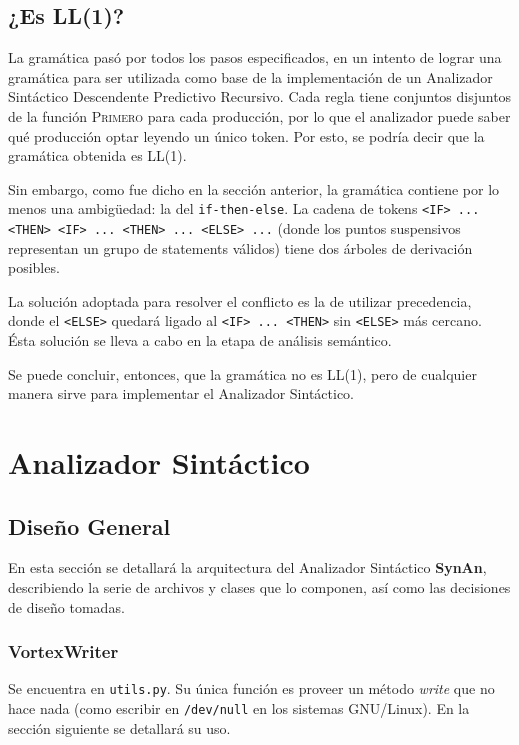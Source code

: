 \documentclass[a4paper,oneside]{report}
\begin{document}
\section{¿Es LL(1)?}
La gramática pasó por todos los pasos especificados, en un intento de lograr una gramática para ser utilizada como base de la implementación de un Analizador Sintáctico Descendente Predictivo Recursivo. Cada regla tiene conjuntos disjuntos de la función \textsc{Primero} para cada producción, por lo que el analizador puede saber qué producción optar leyendo un único token. Por esto, se podría decir que la gramática obtenida es LL(1).

Sin embargo, como fue dicho en la sección anterior, la gramática contiene por lo menos una ambigüedad: la del \verb|if-then-else|. La cadena de tokens \verb|<IF> ... <THEN> <IF> ... <THEN> ... <ELSE> ...| (donde los puntos suspensivos representan un grupo de statements válidos) tiene dos árboles de derivación posibles.

La solución adoptada para resolver el conflicto es la de utilizar precedencia, donde el \verb|<ELSE>| quedará ligado al \verb|<IF> ... <THEN>| sin \verb|<ELSE>| más cercano. Ésta solución se lleva a cabo en la etapa de análisis semántico.

Se puede concluir, entonces, que la gramática no es LL(1), pero de cualquier manera sirve para implementar el Analizador Sintáctico.


\chapter{Analizador Sintáctico}


\section{Diseño General}
En esta sección se detallará la arquitectura del Analizador Sintáctico \textbf{SynAn}, describiendo la serie de archivos y clases que lo componen, así como las decisiones de diseño tomadas. 

\subsection{VortexWriter}
Se encuentra en \verb|utils.py|. Su única función es proveer un método \textit{write} que no hace nada (como escribir en \verb|/dev/null| en los sistemas GNU/Linux). En la sección siguiente se detallará su uso.
\end{document}

